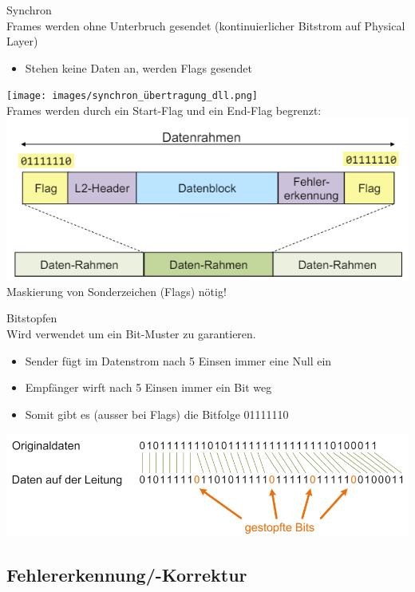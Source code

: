\begin{concept}{Synchron}\\
    Frames werden ohne Unterbruch gesendet (kontinuierlicher Bitstrom auf Physical Layer)
    \begin{itemize}
        \item Stehen keine Daten an, werden Flags gesendet
    \end{itemize}
    \texttt{[image: images/synchron\_übertragung\_dll.png]}\\
    Frames werden durch ein Start-Flag und ein End-Flag begrenzt:\\
    \includegraphics[width=0.6\linewidth]{images/flags_frames.png}\\
    Maskierung von Sonderzeichen (Flags) nötig!
\end{concept}

\begin{concept}{Bitstopfen}\\
    Wird verwendet um ein Bit-Muster zu garantieren.
    \begin{itemize}
        \item Sender fügt im Datenstrom nach 5 Einsen immer eine Null ein
        \item Empfänger wirft nach 5 Einsen immer ein Bit weg
        \item Somit gibt es (ausser bei Flags) die Bitfolge 01111110
    \end{itemize}
        \includegraphics[width=0.7\linewidth]{images/bit_stuffing.png}
\end{concept}

\subsection{Fehlererkennung/-Korrektur}

